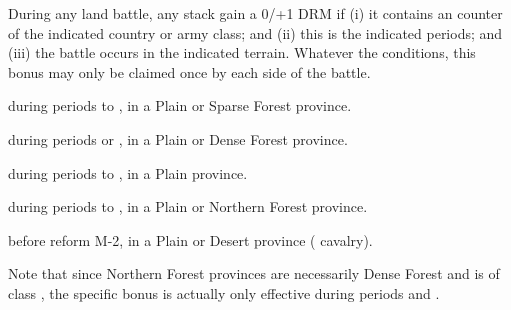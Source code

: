  During any land battle, any stack gain
a 0/+1 DRM if (i) it contains an \ARMY counter of the indicated country or
army class; and (ii) this is the indicated periods; and (iii) the battle
occurs in the indicated terrain. Whatever the conditions, this bonus may only
be claimed once by each side of the battle.
\begin{modlist}
\item[\CAIIM] during periods  to , in a Plain or Sparse
  Forest province.
\item[\CAIIIM] during periods  or , in a Plain or Dense
  Forest province.
\item[\CAIV] during periods  to , in a Plain province.
\item[\SUE] during periods  to , in a Plain or Northern
  Forest province.
\item[\TUR] before reform M-2, in a Plain or Desert province (
  cavalry).
\end{modlist}

Note that since Northern Forest provinces are necessarily Dense Forest and
\SUE is of class \CAIIIM, the specific \SUE bonus is actually only effective
during periods  and .

